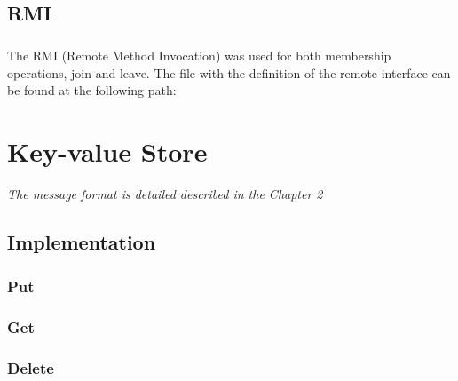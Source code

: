 \documentclass{report}
\begin{document}
			\section{RMI}
				\paragraph{} The RMI (Remote Method Invocation) was used for both
				membership operations, join and leave. The file with the definition 
				of the remote interface can be found at the following path:

				\begin{center}
				\end{center}
				
	\chapter{Key-value Store}
			\emph{The message format is detailed described in the Chapter 2}
	
	        \paragraph{}
	        
	        \paragraph{}

			\section{Implementation}
	
				\paragraph{}
				
				\paragraph{}

				\subsection{Put}
				\subsection{Get}
				\subsection{Delete}
	
\end{document}

